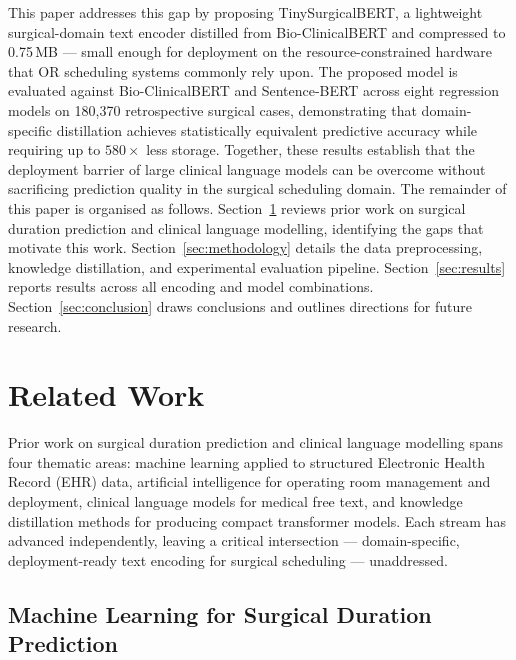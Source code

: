 \documentclass[3p]{elsarticle}
\begin{document}
This paper addresses this gap by proposing TinySurgicalBERT, a lightweight surgical-domain text encoder distilled from Bio-ClinicalBERT and compressed to 0.75\,MB — small enough for deployment on the resource-constrained hardware that OR scheduling systems commonly rely upon. The proposed model is evaluated against Bio-ClinicalBERT and Sentence-BERT across eight regression models on 180{,}370 retrospective surgical cases, demonstrating that domain-specific distillation achieves statistically equivalent predictive accuracy while requiring up to $580\times$ less storage. Together, these results establish that the deployment barrier of large clinical language models can be overcome without sacrificing prediction quality in the surgical scheduling domain. The remainder of this paper is organised as follows. Section~\ref{sec:related_work} reviews prior work on surgical duration prediction and clinical language modelling, identifying the gaps that motivate this work. Section~\ref{sec:methodology} details the data preprocessing, knowledge distillation, and experimental evaluation pipeline. Section~\ref{sec:results} reports results across all encoding and model combinations. Section~\ref{sec:conclusion} draws conclusions and outlines directions for future research.

\section{Related Work}\label{sec:related_work}

Prior work on surgical duration prediction and clinical language modelling spans four thematic areas: machine learning applied to structured Electronic Health Record (EHR) data, artificial intelligence for operating room management and deployment, clinical language models for medical free text, and knowledge distillation methods for producing compact transformer models. Each stream has advanced independently, leaving a critical intersection — domain-specific, deployment-ready text encoding for surgical scheduling — unaddressed.

\subsection{Machine Learning for Surgical Duration Prediction}
\label{sec:rw_ml}
\end{document}
